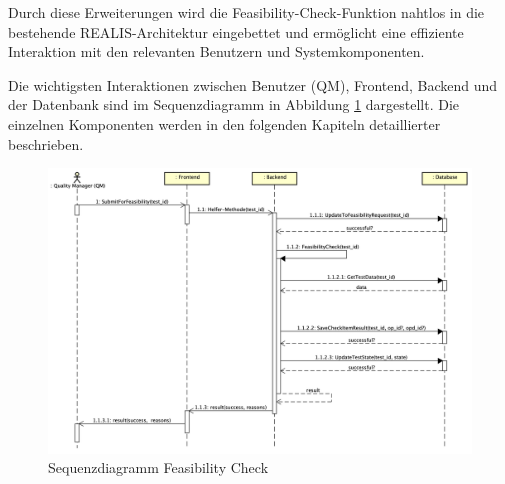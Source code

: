 Durch diese Erweiterungen wird die Feasibility-Check-Funktion nahtlos in die bestehende REALIS-Architektur eingebettet und ermöglicht eine effiziente Interaktion mit den relevanten Benutzern und Systemkomponenten.

Die wichtigsten Interaktionen zwischen Benutzer (\gls{QM}), Frontend, Backend und der Datenbank sind im Sequenzdiagramm in Abbildung \ref{fig:sequence-diagram} dargestellt. Die einzelnen Komponenten werden in den folgenden Kapiteln detaillierter beschrieben. 

\begin{figure}[!htbp]
    \centering
    \includegraphics[width=1\textwidth]{bilder/Feasibility-Sequenz-Diagramm.png}
    \caption{Sequenzdiagramm Feasibility Check}
    \label{fig:sequence-diagram}
\end{figure}


